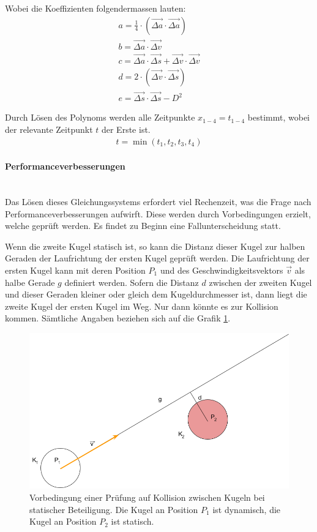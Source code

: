 Wobei die Koeffizienten folgendermassen lauten:
\begin{align}
    a = \frac{1}{4} \cdot (\vec{\Delta a} \cdot \vec{\Delta a})\\
    b = \vec{\Delta a} \cdot \vec{\Delta v}\\
    c = \vec{\Delta a} \cdot \vec{\Delta s} + \vec{\Delta v} \cdot \vec{\Delta v}\\
    d = 2 \cdot (\vec{\Delta v} \cdot \vec{\Delta s})\\
    e = \vec{\Delta s} \cdot \vec{\Delta s} - D^2
\end{align}

Durch Lösen des Polynoms werden alle Zeitpunkte $x_{1-4} = t_{1-4}$ bestimmt, wobei der relevante Zeitpunkt $t$ der
Erste ist.
\begin{align}
    t = \min{(t_1, t_2, t_3, t_4)}
\end{align}

\paragraph{Performanceverbesserungen}\label{kap:kugelkollision:performanceverbesserung} \hfill \\
Das Lösen dieses Gleichungssystems erfordert viel Rechenzeit, was die Frage nach Performanceverbesserungen aufwirft.
Diese werden durch Vorbedingungen erzielt, welche geprüft werden. Es findet zu Beginn eine Fallunterscheidung statt.

Wenn die zweite Kugel statisch ist, so kann die Distanz dieser Kugel zur halben Geraden der Laufrichtung der ersten Kugel geprüft werden.
Die Laufrichtung der ersten Kugel kann mit deren Position $P_1$ und des Geschwindigkeitsvektors $\vec{v}$ als halbe Gerade $g$ definiert werden.
Sofern die Distanz $d$ zwischen der zweiten Kugel und dieser Geraden kleiner oder gleich dem Kugeldurchmesser ist,
dann liegt die zweite Kugel der ersten Kugel im Weg.
Nur dann könnte es zur Kollision kommen.
Sämtliche Angaben beziehen sich auf die Grafik \ref{fig:kugelkollision_vorbedingung_statisch}.

\begin{figure}[h!]
    \begin{center}
        \includegraphics[width=0.4\linewidth]{../common/03_billiard_ai/resources/24_vorbedingung_kugelkollision_statisch.png}
    \end{center}
    \caption{Vorbedingung einer Prüfung auf Kollision zwischen Kugeln bei statischer Beteiligung.
    Die Kugel an Position $P_1$ ist dynamisch, die Kugel an Position $P_2$ ist statisch.}
    \label{fig:kugelkollision_vorbedingung_statisch}
\end{figure}

